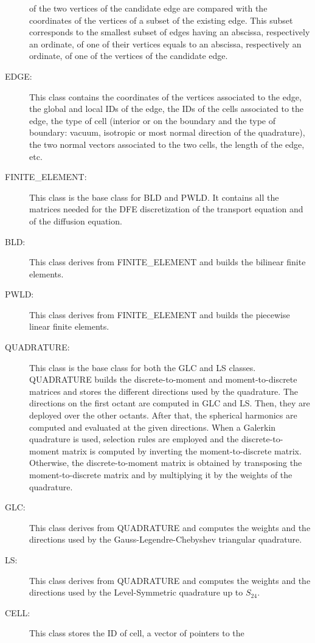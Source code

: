 \begin{description}
    of the two vertices of the candidate edge are compared with the
    coordinates of the vertices of a subset of the existing edge. This subset
    corresponds to the smallest subset of edges having an abscissa,
    respectively an ordinate, of one of their vertices equals to an abscissa,
    respectively an ordinate, of one of the vertices of the candidate edge.
  \item[EDGE:] This class contains the coordinates of the vertices associated
    to the edge, the global and local IDs of the edge, the IDs of the cells 
    associated to the edge, the type of cell (interior or on the boundary and 
    the type of boundary: vacuum, isotropic or most normal direction of the
    quadrature), the two normal vectors associated to the two cells, the 
    length of the edge, etc.
  \item[FINITE\_ELEMENT:] This class is the base class for BLD and PWLD.
    It contains all the matrices needed for the DFE discretization of the transport
    equation and of the diffusion equation.
  \item[BLD:] This class derives from FINITE\_ELEMENT and builds the bilinear
    finite elements.
  \item[PWLD:] This class derives from FINITE\_ELEMENT and builds the
    piecewise linear finite elements.
  \item[QUADRATURE:] This class is the base class for both the GLC and LS classes. 
    QUADRATURE builds the discrete-to-moment and moment-to-discrete matrices and
    stores the different directions used by the quadrature. The
    directions on the first octant are computed in GLC and LS. Then, they are
    deployed over the other octants. After that, the spherical harmonics
    are computed and evaluated at the given directions. When a Galerkin
    quadrature is used, selection rules are employed and the discrete-to-moment
    matrix is computed by inverting the moment-to-discrete matrix. Otherwise,
    the discrete-to-moment matrix is obtained by transposing the moment-to-discrete
    matrix and by multiplying it by the weights of the quadrature.
  \item[GLC:] This class derives from QUADRATURE and computes the weights and
    the directions used by the Gauss-Legendre-Chebyshev triangular quadrature.
  \item[LS:] This class derives from QUADRATURE and computes the weights and
    the directions used by the Level-Symmetric quadrature up to $S_{24}$.
  \item[CELL:] This class stores the ID of cell, a vector of pointers to the

\end{description}
